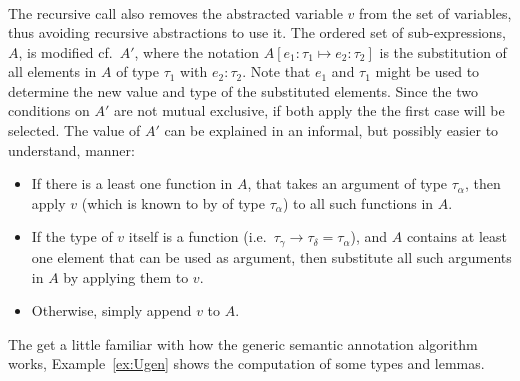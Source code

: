 \begin{definition}
\begin{align*}
\end{align*}
The recursive call also removes the abstracted variable $v$ from the set of variables, thus avoiding recursive abstractions to use it. The ordered set of sub-expressions, $A$, is modified cf.\ $A'$, where the notation $A[e_1 : \tau_1 \mapsto e_2 : \tau_2]$ is the substitution of all elements in $A$ of type $\tau_1$ with $e_2 : \tau_2$. Note that $e_1$ and $\tau_1$ might be used to determine the new value and type of the substituted elements. Since the two conditions on $A'$ are not mutual exclusive, if both apply the the first case will be selected. The value of $A'$ can be explained in an informal, but possibly easier to understand, manner: 
\begin{itemize}
	\item If there is a least one function in $A$, that takes an argument of type $\tau_\alpha$, then apply $v$ (which is known to by of type $\tau_\alpha$) to all such functions in $A$.
	\item If the type of $v$ itself is a function (i.e.\ $\tau_\gamma \to \tau_\delta = \tau_\alpha$), and $A$ contains at least one element that can be used as argument, then substitute all such arguments in $A$ by applying them to $v$.
	\item Otherwise, simply append $v$ to $A$.
\end{itemize} 
\label{def:Ugen}
\end{definition}
\done
\vspace*{-2em}
\clearpage

The get a little familiar with how the generic semantic annotation algorithm works, Example~\ref{ex:Ugen} shows the computation of some types and lemmas.

